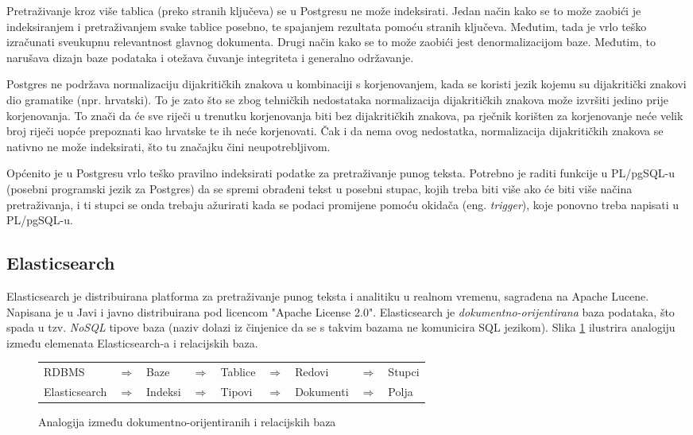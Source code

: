 \documentclass[a4paper,twoside,12pt]{scrreprt}
\begin{document}
Pretraživanje kroz više tablica (preko stranih ključeva) se u Postgresu ne može indeksirati. Jedan način kako se to može zaobići je indeksiranjem i pretraživanjem svake tablice posebno, te spajanjem rezultata pomoću stranih ključeva. Međutim, tada je vrlo teško izračunati sveukupnu relevantnost glavnog dokumenta. Drugi način kako se to može zaobići jest denormalizacijom baze. Međutim, to narušava dizajn baze podataka i otežava čuvanje integriteta i generalno održavanje.

Postgres ne podržava normalizaciju dijakritičkih znakova u kombinaciji s korjenovanjem, kada se koristi jezik kojemu su dijakritički znakovi dio gramatike (npr. hrvatski). To je zato što se zbog tehničkih nedostataka normalizacija dijakritičkih znakova može izvršiti jedino prije korjenovanja. To znači da će sve riječi u trenutku korjenovanja biti bez dijakritičkih znakova, pa rječnik korišten za korjenovanje neće velik broj riječi uopće prepoznati kao hrvatske te ih neće korjenovati. Čak i da nema ovog nedostatka, normalizacija dijakritičkih znakova se nativno ne može indeksirati, što tu značajku čini neupotrebljivom.

Općenito je u Postgresu vrlo teško pravilno indeksirati podatke za pretraživanje punog teksta. Potrebno je raditi funkcije u PL/pgSQL-u (posebni programski jezik za Postgres) da se spremi obrađeni tekst u posebni stupac, kojih treba biti više ako će biti više načina pretraživanja, i ti stupci se onda trebaju ažurirati kada se podaci promijene pomoću okidača (eng. \textit{trigger}), koje ponovno treba napisati u PL/pgSQL-u.

\subsection{Elasticsearch}

Elasticsearch je distribuirana platforma za pretraživanje punog teksta i analitiku u realnom vremenu, sagrađena na Apache Lucene. Napisana je u Javi i javno distribuirana pod licencom "Apache License 2.0". Elasticsearch je \textit{dokumentno-orijentirana} baza podataka, što spada u tzv. \textit{NoSQL} tipove baza (naziv dolazi iz činjenice da se s takvim bazama ne komunicira SQL jezikom). Slika \ref{elasticsearch} ilustrira analogiju između elemenata Elasticsearch-a i relacijskih baza.

\begin{figure}[H]
  \centering
  \begin{tabular}{lllllllll}
    RDBMS         & $\Rightarrow$ & Baze    & $\Rightarrow$ & Tablice & $\Rightarrow$ & Redovi    & $\Rightarrow$ & Stupci \\
    Elasticsearch & $\Rightarrow$ & Indeksi & $\Rightarrow$ & Tipovi  & $\Rightarrow$ & Dokumenti & $\Rightarrow$ & Polja  \\
  \end{tabular}
  \caption{Analogija između dokumentno-orijentiranih i relacijskih baza}
  \label{elasticsearch}
\end{figure}
\end{document}
